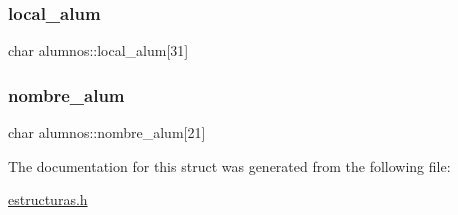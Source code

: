 \subsubsection{\texorpdfstring{local\+\_\+alum}{local\_alum}}
{\footnotesize\ttfamily char alumnos\+::local\+\_\+alum\mbox{[}31\mbox{]}}

\mbox{\label{structalumnos_a99ddf967c6149106fcdd8d74064dec00}} 
\subsubsection{\texorpdfstring{nombre\+\_\+alum}{nombre\_alum}}
{\footnotesize\ttfamily char alumnos\+::nombre\+\_\+alum\mbox{[}21\mbox{]}}



The documentation for this struct was generated from the following file\+:\begin{DoxyCompactItemize}
\item 
\mbox{\hyperlink{estructuras_8h}{estructuras.\+h}}\end{DoxyCompactItemize}
